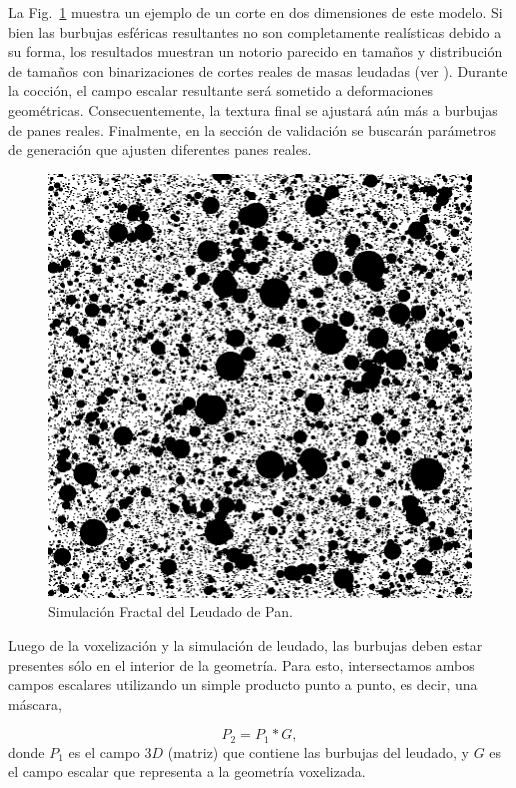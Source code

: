 \documentclass[spanish,a4paper,openright,11pt]{book}
\begin{document}
La Fig.~\ref{FigProving} muestra un ejemplo de un corte en dos dimensiones de este modelo.
Si bien las burbujas esféricas resultantes no son completamente realísticas debido a su forma, los resultados muestran un notorio parecido en tamaños y distribución de tamaños con binarizaciones de cortes reales de masas leudadas (ver \cite{Babin2006}).
Durante la cocción, el campo escalar resultante será sometido a deformaciones geométricas. Consecuentemente, la textura final se ajustará aún más a burbujas de panes reales.
Finalmente, en la sección de validación se buscarán parámetros de generación que ajusten diferentes panes reales. 

\begin{figure}
\includegraphics[scale=0.28]{figures/bubbles}
\caption{Simulación Fractal del Leudado de Pan.}
\label{FigProving}
\end{figure}

Luego de la voxelización y la simulación de leudado, las burbujas deben estar presentes sólo en el interior de la geometría.
Para esto, intersectamos ambos campos escalares utilizando un simple producto punto a punto, es decir, una máscara,

\begin{equation*}
P_{2} = P_{1} * G,
\end{equation*}
%
donde $P_{1}$ es el campo $3D$ (matriz) que contiene las burbujas del leudado, y $G$ es el campo escalar que representa a la geometría voxelizada.
\end{document}
